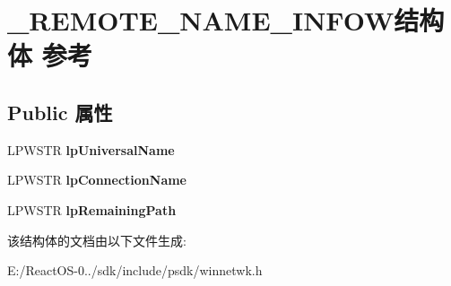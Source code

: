 \hypertarget{struct___r_e_m_o_t_e___n_a_m_e___i_n_f_o_w}{}\section{\+\_\+\+R\+E\+M\+O\+T\+E\+\_\+\+N\+A\+M\+E\+\_\+\+I\+N\+F\+O\+W结构体 参考}
\label{struct___r_e_m_o_t_e___n_a_m_e___i_n_f_o_w}
\subsection*{Public 属性}
\begin{DoxyCompactItemize}
\item 
\mbox{\label{struct___r_e_m_o_t_e___n_a_m_e___i_n_f_o_w_a0b13519705b5b3b3bfb1778cd5486931}} 
L\+P\+W\+S\+TR {\bfseries lp\+Universal\+Name}
\item 
\mbox{\label{struct___r_e_m_o_t_e___n_a_m_e___i_n_f_o_w_a4c68ddb82240226a619f0088c67063d6}} 
L\+P\+W\+S\+TR {\bfseries lp\+Connection\+Name}
\item 
\mbox{\label{struct___r_e_m_o_t_e___n_a_m_e___i_n_f_o_w_a53250e348bb2706aa04914fd85d47e2b}} 
L\+P\+W\+S\+TR {\bfseries lp\+Remaining\+Path}
\end{DoxyCompactItemize}


该结构体的文档由以下文件生成\+:\begin{DoxyCompactItemize}
\item 
E\+:/\+React\+O\+S-\/0../sdk/include/psdk/winnetwk.\+h\end{DoxyCompactItemize}
